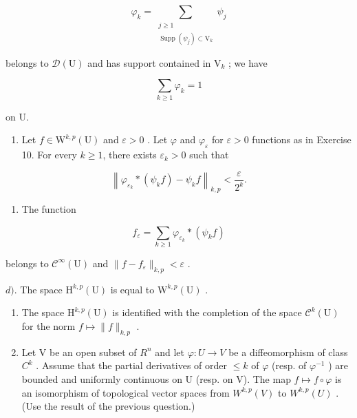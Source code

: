 \[
\varphi_{k} = \sum_{\substack{j\geqslant 1\\ \operatorname{Supp}(\psi_{j})\subset \mathrm{V}_{k}}}\psi_{j}
\]

belongs to \(\mathcal{D}(\mathrm{U})\) and has support contained in \(\mathrm{V}_k\) ; we have

\[
\sum_ {k \geqslant 1} \varphi_ {k} = 1
\]

on U.

\begin{enumerate}
\def\labelenumi{\alph{enumi})}
\setcounter{enumi}{1}
\tightlist
\item
  Let \(f \in \mathrm{W}^{k,p}(\mathrm{U})\) and \(\varepsilon > 0\) . Let \(\varphi\) and \(\varphi_{\varepsilon}\) for \(\varepsilon > 0\) functions as in Exercise 10. For every \(k \geqslant 1\), there exists \(\varepsilon_{k} > 0\) such that
\end{enumerate}

\[
\left\| \varphi_ {\varepsilon_ {k}} * (\psi_ {k} f) - \psi_ {k} f \right\| _ {k, p} <   \frac {\varepsilon}{2 ^ {k}}.
\]

\begin{enumerate}
\def\labelenumi{\alph{enumi})}
\setcounter{enumi}{2}
\tightlist
\item
  The function
\end{enumerate}

\[
f _ {\varepsilon} = \sum_ {k \geqslant 1} \varphi_ {\varepsilon_ {k}} * (\psi_ {k} f)
\]

belongs to \(\mathcal{C}^{\infty}(\mathrm{U})\) and \(\| f - f_{\varepsilon}\|_{k,p} < \varepsilon\) .

\(d)\). The space \(\mathrm{H}^{k,p}(\mathrm{U})\) is equal to \(\mathrm{W}^{k,p}(\mathrm{U})\) .

\begin{enumerate}
\def\labelenumi{\alph{enumi})}
\setcounter{enumi}{4}
\item
  The space \(\mathrm{H}^{k,p}(\mathrm{U})\) is identified with the completion of the space \(\mathcal{C}^{k}(\mathrm{U})\) for the norm \(f \mapsto \|f\|_{k,p}\) .
\item
  Let V be an open subset of \(R^{n}\) and let \(\varphi\colon U\to V\) be a diffeomorphism of class \(C^{k}\) . Assume that the partial derivatives of order \(\leqslant k\) of \(\varphi\) (resp. of \(\varphi^{-1}\) ) are bounded and uniformly continuous on U (resp. on V). The map \(f\mapsto f\circ\varphi\) is an isomorphism of topological vector spaces from \(W^{k,p}(V)\) to \(W^{k,p}(U)\) . (Use the result of the previous question.)
\end{enumerate}

